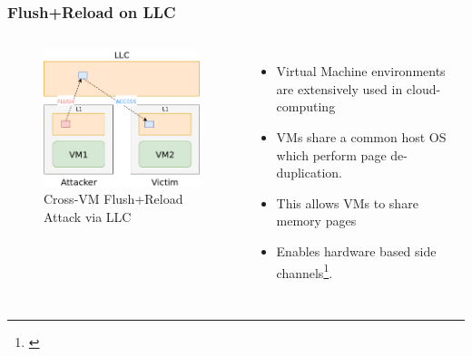 \documentclass[10pt]{beamer}
\begin{document}
\begin{frame}
\frametitle{Flush+Reload on LLC}

\begin{columns}[c]
\begin{figure}
\includegraphics[width=\textwidth]{flush_reload_crossvm}
\caption{Cross-VM Flush+Reload Attack via LLC}
\end{figure}

    \begin{itemize}
        \item Virtual Machine environments are extensively used in cloud-computing
        \item VMs share a common host OS which perform page de-duplication.
        \item This allows VMs to share memory pages
        \item Enables hardware based side channels\footnote[frame]{\cite{cross_vm}}.
    \end{itemize}
\end{columns}
\end{frame}
\end{document}
